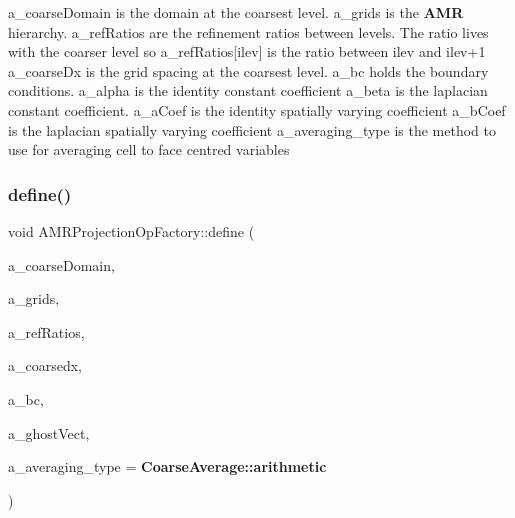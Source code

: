 a\+\_\+coarse\+Domain is the domain at the coarsest level. a\+\_\+grids is the \textbf{ A\+MR} hierarchy. a\+\_\+ref\+Ratios are the refinement ratios between levels. The ratio lives with the coarser level so a\+\_\+ref\+Ratios\mbox{[}ilev\mbox{]} is the ratio between ilev and ilev+1 a\+\_\+coarse\+Dx is the grid spacing at the coarsest level. a\+\_\+bc holds the boundary conditions. a\+\_\+alpha is the identity constant coefficient a\+\_\+beta is the laplacian constant coefficient. a\+\_\+a\+Coef is the identity spatially varying coefficient a\+\_\+b\+Coef is the laplacian spatially varying coefficient a\+\_\+averaging\+\_\+type is the method to use for averaging cell to face centred variables \mbox{\label{class_a_m_r_projection_op_factory_afb2b5b8c9667efa30cf9b90b6c0f455b}} 
\subsubsection{\texorpdfstring{define()}{define()}\hspace{0.1cm}{\footnotesize\ttfamily [2/2]}}
{\footnotesize\ttfamily void A\+M\+R\+Projection\+Op\+Factory\+::define (\begin{DoxyParamCaption}\item[{const \textbf{ Problem\+Domain} \&}]{a\+\_\+coarse\+Domain,  }\item[{const \textbf{ Vector}$<$ \textbf{ Disjoint\+Box\+Layout} $>$ \&}]{a\+\_\+grids,  }\item[{const \textbf{ Vector}$<$ int $>$ \&}]{a\+\_\+ref\+Ratios,  }\item[{const \textbf{ Real} \&}]{a\+\_\+coarsedx,  }\item[{\textbf{ B\+C\+Holder}}]{a\+\_\+bc,  }\item[{const \textbf{ Int\+Vect} \&}]{a\+\_\+ghost\+Vect,  }\item[{int}]{a\+\_\+averaging\+\_\+type = {\ttfamily \textbf{ Coarse\+Average\+::arithmetic}} }\end{DoxyParamCaption})}

